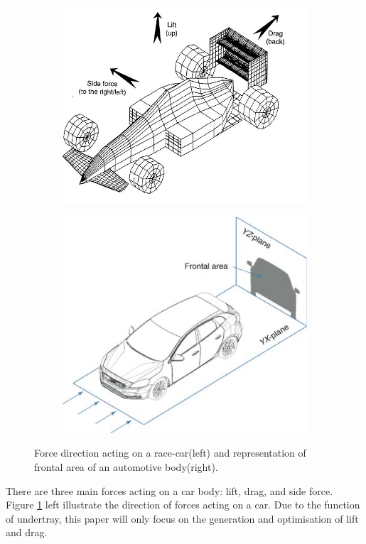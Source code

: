 \begin{figure}[!h]
\begin{center}
%    
  \begin{subfigure}[b]{0.4\textwidth}
    \includegraphics[scale=0.4]{Figures/race_car_forces.jpg}
  \end{subfigure}
  \begin{subfigure}[b]{0.4\textwidth}
    \includegraphics[scale=0.8]{Figures/frontal_area.jpg}
  \end{subfigure}
%  
  \caption{Force direction acting on a race-car(left) and representation of frontal area of an automotive body(right)\cite{Sebben2014FundamentalsDesign}.}
    \label{fig:Force direction and frontal area}
\end{center}
\end{figure}
\noindent There are three main forces acting on a car body: lift, drag, and side force. Figure \ref{fig:Force direction and frontal area} left illustrate the direction of forces acting on a car. Due to the function of undertray, this paper will only focus on the generation and optimisation of lift and drag.

